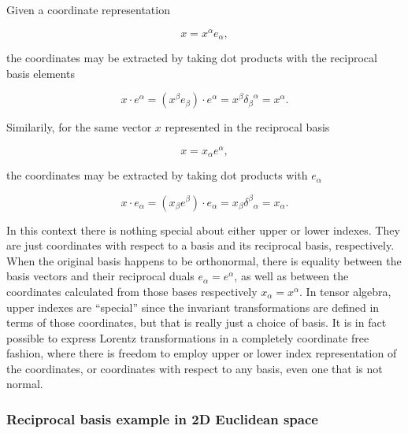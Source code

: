 Given a coordinate representation

\begin{equation}\label{eqn:grahamSchmidtLorentz:880}
x = x^\alpha e_\alpha,
\end{equation}

the coordinates may be extracted by taking dot products with the reciprocal basis elements

\begin{equation}\label{eqn:grahamSchmidtLorentz:340}
x \cdot e^\alpha = (x^\beta e_\beta) \cdot e^\alpha = x^\beta {\delta_\beta}^\alpha = x^\alpha.
\end{equation}

Similarily, for the same vector $x$ represented in the reciprocal basis

\begin{equation}\label{eqn:grahamSchmidtLorentz:900}
x = x_\alpha e^\alpha,
\end{equation}

the coordinates may be extracted by taking dot products with $e_\alpha$

\begin{equation}\label{eqn:grahamSchmidtLorentz:340b}
x \cdot e_\alpha = (x_\beta e^\beta) \cdot e_\alpha = x_\beta {\delta^\beta}_\alpha = x_\alpha.
\end{equation}

In this context there is nothing special about either upper or lower indexes.  They are just coordinates with respect to a basis and its reciprocal basis, respectively.  When the original basis happens to be orthonormal, there is equality between the basis vectors and their reciprocal duals $e_\alpha = e^\alpha$, as well as between the coordinates calculated from those bases respectively $x_\alpha = x^\alpha$.  In tensor algebra, upper indexes are ``special'' since the invariant transformations are defined in terms of those coordinates, but that is really just a choice of basis.  It is in fact possible \citep{doran2003gap} to express Lorentz transformations in a completely coordinate free fashion, where there is freedom to employ upper or lower index representation of the coordinates, or coordinates with respect to any basis, even one that is not normal.

\subsubsection{Reciprocal basis example in 2D Euclidean space}

